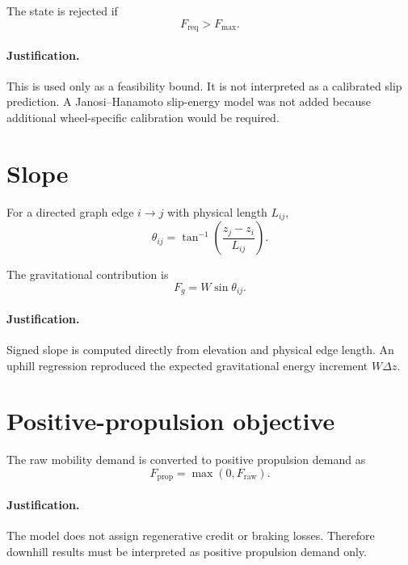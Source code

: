 \documentclass[11pt]{article}
\begin{document}
The state is rejected if
\begin{equation}
F_{\mathrm{req}}>F_{\max}.
\end{equation}

\paragraph{Justification.}
This is used only as a feasibility bound. It is not interpreted as a calibrated slip prediction. A Janosi--Hanamoto slip-energy model was not added because additional wheel-specific calibration would be required.

\section{Slope}

For a directed graph edge $i\rightarrow j$ with physical length $L_{ij}$,
\begin{equation}
\theta_{ij}
=
\tan^{-1}
\left(
\frac{z_j-z_i}{L_{ij}}
\right).
\end{equation}

The gravitational contribution is
\begin{equation}
F_g=W\sin\theta_{ij}.
\end{equation}

\paragraph{Justification.}
Signed slope is computed directly from elevation and physical edge length. An uphill regression reproduced the expected gravitational energy increment $W\Delta z$.

\section{Positive-propulsion objective}

The raw mobility demand is converted to positive propulsion demand as
\begin{equation}
F_{\mathrm{prop}}=\max(0,F_{\mathrm{raw}}).
\end{equation}

\paragraph{Justification.}
The model does not assign regenerative credit or braking losses. Therefore downhill results must be interpreted as positive propulsion demand only.
\end{document}

